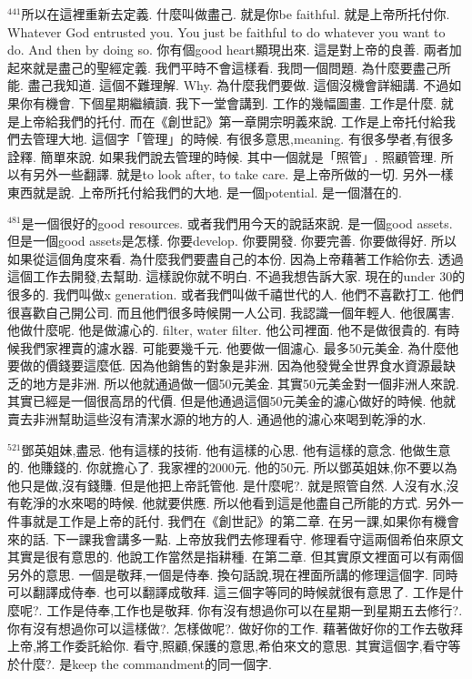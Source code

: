 \documentclass{book}
\begin{document}
$^{441}$所以在這裡重新去定義.
什麼叫做盡己.
就是你be faithful.
就是上帝所托付你.
Whatever God entrusted you.
You just be faithful to do whatever you want to do.
And then by doing so.
你有個good heart顯現出來.
這是對上帝的良善.
兩者加起來就是盡己的聖經定義.
我們平時不會這樣看.
我問一個問題.
為什麼要盡己所能.
盡己我知道.
這個不難理解.
Why.
為什麼我們要做.
這個沒機會詳細講.
不過如果你有機會.
下個星期繼續讀.
我下一堂會講到.
工作的幾幅圖畫.
工作是什麼.
就是上帝給我們的托付.
而在《創世記》第一章開宗明義來說.
工作是上帝托付給我們去管理大地.
這個字「管理」的時候.
有很多意思,meaning.
有很多學者,有很多詮釋.
簡單來說.
如果我們說去管理的時候.
其中一個就是「照管」.
照顧管理.
所以有另外一些翻譯.
就是to look after, to take care.
是上帝所做的一切.
另外一樣東西就是說.
上帝所托付給我們的大地.
是一個potential.
是一個潛在的.

$^{481}$是一個很好的good resources.
或者我們用今天的說話來說.
是一個good assets.
但是一個good assets是怎樣.
你要develop.
你要開發.
你要完善.
你要做得好.
所以如果從這個角度來看.
為什麼我們要盡自己的本份.
因為上帝藉著工作給你去.
透過這個工作去開發,去幫助.
這樣說你就不明白.
不過我想告訴大家.
現在的under 30的很多的.
我們叫做x generation.
或者我們叫做千禧世代的人.
他們不喜歡打工.
他們很喜歡自己開公司.
而且他們很多時候開一人公司.
我認識一個年輕人.
他很厲害.
他做什麼呢.
他是做濾心的.
filter, water filter.
他公司裡面.
他不是做很貴的.
有時候我們家裡賣的濾水器.
可能要幾千元.
他要做一個濾心.
最多50元美金.
為什麼他要做的價錢要這麼低.
因為他銷售的對象是非洲.
因為他發覺全世界食水資源最缺乏的地方是非洲.
所以他就通過做一個50元美金.
其實50元美金對一個非洲人來說.
其實已經是一個很高昂的代價.
但是他通過這個50元美金的濾心做好的時候.
他就賣去非洲幫助這些沒有清潔水源的地方的人.
通過他的濾心來喝到乾淨的水.

$^{521}$鄧英姐妹,盡忌.
他有這樣的技術.
他有這樣的心思.
他有這樣的意念.
他做生意的.
他賺錢的.
你就擔心了.
我家裡的2000元.
他的50元.
所以鄧英姐妹,你不要以為他只是做,沒有錢賺.
但是他把上帝託管他.
是什麼呢?.
就是照管自然.
人沒有水,沒有乾淨的水來喝的時候.
他就要供應.
所以他看到這是他盡自己所能的方式.
另外一件事就是工作是上帝的託付.
我們在《創世記》的第二章.
在另一課,如果你有機會來的話.
下一課我會講多一點.
上帝放我們去修理看守.
修理看守這兩個希伯來原文其實是很有意思的.
他說工作當然是指耕種.
在第二章.
但其實原文裡面可以有兩個另外的意思.
一個是敬拜,一個是侍奉.
換句話說,現在裡面所講的修理這個字.
同時可以翻譯成侍奉.
也可以翻譯成敬拜.
這三個字等同的時候就很有意思了.
工作是什麼呢?.
工作是侍奉,工作也是敬拜.
你有沒有想過你可以在星期一到星期五去修行?.
你有沒有想過你可以這樣做?.
怎樣做呢?.
做好你的工作.
藉著做好你的工作去敬拜上帝,將工作委託給你.
看守,照顧,保護的意思,希伯來文的意思.
其實這個字,看守等於什麼?.
是keep the commandment的同一個字.
\end{document}

